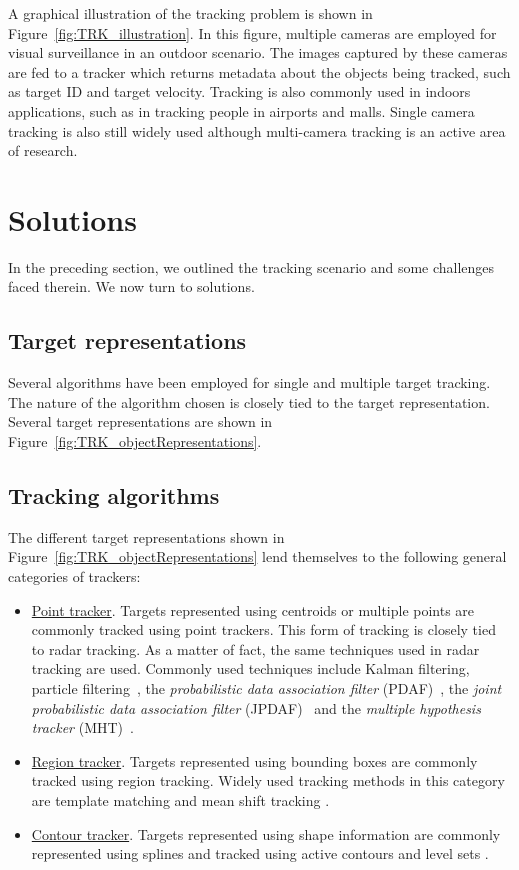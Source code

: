 A graphical illustration of the tracking problem is shown in Figure~\ref{fig:TRK_illustration}.  In this figure, multiple cameras are employed for visual surveillance in an outdoor scenario.  The images captured by these cameras are fed to a tracker which returns metadata about the objects being tracked, such as target ID and target velocity.  Tracking is also commonly used in indoors applications, such as in tracking people in airports and malls.  Single camera tracking is also still widely used although multi-camera tracking is an active area of research.

\section{Solutions}
In the preceding section, we outlined the tracking scenario and some challenges faced therein.  We now turn to solutions.  

\subsection{Target representations}
Several algorithms have been employed for single and multiple target tracking.  The nature of the algorithm chosen is closely tied to the target representation.  Several target representations are shown in Figure~\ref{fig:TRK_objectRepresentations}.  

\subsection{Tracking algorithms}
The different target representations shown in Figure~\ref{fig:TRK_objectRepresentations} lend themselves to the following general categories of trackers:

\begin{itemize}
\item \underline{Point tracker}.  Targets represented using centroids or multiple points are commonly tracked using point trackers.  This form of tracking is closely tied to radar tracking.  As a matter of fact, the same techniques used in radar tracking are used.  Commonly used techniques include Kalman filtering, particle filtering~\cite{2002_JNL_PF_Arulampalam}, the \emph{probabilistic data association filter} (PDAF)~\cite{1975_JNL_PDAF_BarShalom}, the \emph{joint probabilistic data association filter} (JPDAF)~\cite{1983_JNL_JPDAF_Fortmann} and the \emph{multiple hypothesis tracker} (MHT)~\cite{1979_JNL_MTT_Reid}.
\item \underline{Region tracker}.  Targets represented using bounding boxes are commonly tracked using region tracking.  Widely used tracking methods in this category are template matching and mean shift tracking \cite{2002_JNL_MeanShift_Comaniciu}.
\item \underline{Contour tracker}.  Targets represented using shape information are commonly represented using splines and tracked using active contours \cite{2000_BOOK_ActiveVision_Blake} and level sets \cite{1995_JNL_LevelSets_Malladi}.
\end{itemize}

